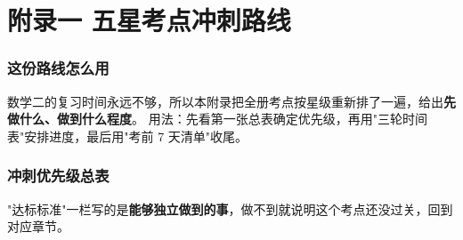 \documentclass[11pt,openany,UTF8]{ctexbook}
\begin{document}
\chapter*{附录一 五星考点冲刺路线}
\subsection{这份路线怎么用}

数学二的复习时间永远不够，所以本附录把全册考点按星级重新排了一遍，给出\textbf{先做什么、做到什么程度}。 用法：先看第一张总表确定优先级，再用"三轮时间表"安排进度，最后用"考前 7 天清单"收尾。

\subsection{冲刺优先级总表}

"达标标准"一栏写的是\textbf{能够独立做到的事}，做不到就说明这个考点还没过关，回到对应章节。
\end{document}

